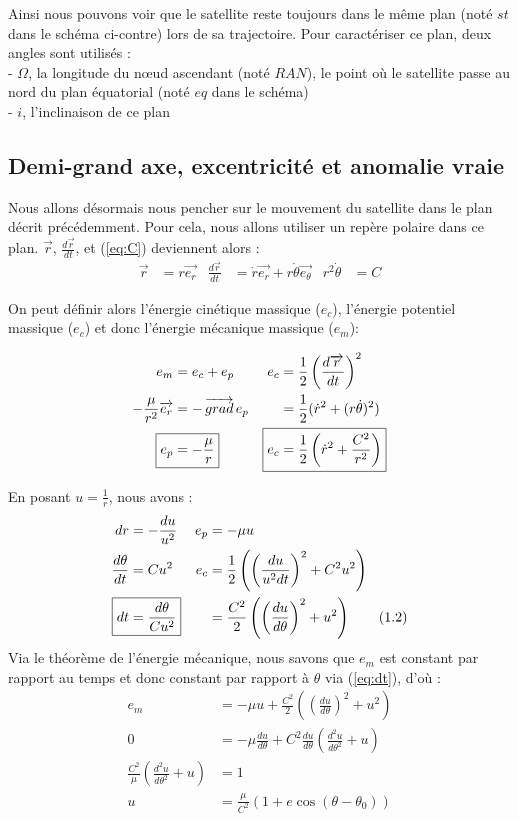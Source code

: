 \documentclass{report}
\DeclareMathOperator{\grad}{\overrightarrow{grad}}
\begin{document}
Ainsi nous pouvons voir que le satellite reste toujours dans le même plan (noté $st$ dans le schéma ci-contre) lors de sa trajectoire. Pour caractériser ce plan, deux angles sont utilisés :\\
- $\Omega$, la longitude du nœud ascendant (noté $RAN$), le point où le satellite passe au nord du plan équatorial (noté $eq$ dans le schéma)\\
- $i$, l'inclinaison de ce plan

\clearpage
\subsection{Demi-grand axe, excentricité et anomalie vraie}

Nous allons désormais nous pencher sur le mouvement du satellite dans le plan décrit précédemment. Pour cela, nous allons utiliser un repère polaire dans ce plan. $\overrightarrow r$, $\frac{d\overrightarrow r}{dt}$, et (\ref{eq:C}) deviennent alors :
\begin{align*}
\overrightarrow r&=r\overrightarrow{e_r}&\frac{d\overrightarrow r}{dt}&=\dot r\overrightarrow{e_r}+r\dot\theta\overrightarrow{e_\theta}&
r^2\dot\theta&=C
\end{align*}

On peut définir alors l'énergie cinétique massique ($e_c$), l'énergie potentiel massique ($e_c$) et donc l'énergie mécanique massique ($e_m$):

\begin{align*}
e_m&=e_c+e_p&      						e_c&=\frac{1}{2}\left(\frac{d\overrightarrow r}{dt}\right)^2\\
-\frac{\mu}{r^2}\overrightarrow{e_r}&=-\grad e_p&	&=\frac{1}{2}(\dot r^2+(r\dot\theta)^2)\\
\Aboxed{e_p&=-\frac\mu r}& 					\Aboxed{e_c&=\frac{1}{2}\left(\dot r^2+\frac{C^2}{r^2}\right)}
\end{align*}

En posant $u=\frac{1}{r}$, nous avons :
\begin{align*}
dr&=-\frac{du}{u^2}&e_p&=-\mu u\\
\frac{d\theta}{dt}&=Cu^2&e_c&=\frac{1}{2}\left(\left(\frac{du}{u^2dt}\right)^2+C^2u^2\right)\\
\Aboxed{dt&=\frac{d\theta}{Cu^2}}&&=\frac{C^2}{2}\left(\left(\frac{du}{d\theta}\right)^2+u^2\right)\tag{1.2}\label{eq:dt}
\stepcounter{equation}
\end{align*}
Via le théorème de l'énergie mécanique, nous savons que $e_m$ est constant par rapport au temps et donc constant par rapport à $\theta$ via (\ref{eq:dt}), d'où :
\begin{align*}
e_m&=-\mu u+\frac{C^2}{2}\left(\left(\frac{du}{d\theta}\right)^2+u^2\right)\\
0&=-\mu\frac{du}{d\theta}+C^2\frac{du}{d\theta}\left(\frac{d^2u}{d\theta^2}+u\right)\\
\frac{C^2}{\mu}\left(\frac{d^2u}{d\theta^2}+u\right)&=1\\
u&=\frac{\mu}{C^2}(1+e\cos(\theta-\theta_0))\tag{$\theta_0$ et $e$ Constantes d'intégration}
\end{align*}
\end{document}
